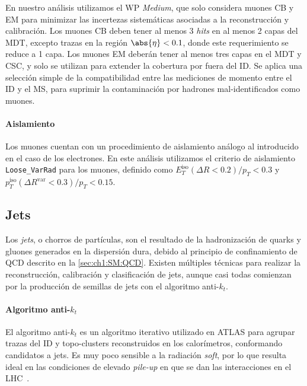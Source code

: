 En nuestro análisis utilizamos el WP \textit{Medium}, que solo considera muones CB y EM para minimizar las incertezas sistemáticas asociadas a la reconstrucción y calibración. Los muones CB deben tener al menos 3 \textit{hits} en al menos 2 capas del MDT, excepto trazas en la región $\abs{\eta} < 0.1$, donde este requerimiento se reduce a 1 capa. Los muones EM deberán tener al menos tres capas en el MDT y CSC, y solo se utilizan para extender la cobertura por fuera del ID. Se aplica una selección simple de la compatibilidad entre las mediciones de momento entre el ID y el MS, para suprimir la contaminación por hadrones mal-identificados como muones.

\paragraph{Aislamiento}

Los muones cuentan con un procedimiento de aislamiento análogo al introducido en el caso de los electrones. En este análisis utilizamos el criterio de aislamiento \texttt{Loose\_VarRad} para los muones, definido como $E_T^{\text{iso}}(\Delta R < 0.2)/p_T < 0.3$ y $p_T^{\text{iso}}(\Delta R^{\text{var}} < 0.3)/p_T < 0.15$.




\subsection{Jets} \label{sec:ch3:jets}

Los \textit{jets}, o chorros de partículas, son el resultado de la hadronización de quarks y gluones generados en la dispersión dura, debido al principio de confinamiento de QCD descrito en la \cref{sec:ch1:SM:QCD}. Existen múltiples técnicas para realizar la reconstrucción, calibración y clasificación de jets, aunque casi todas comienzan por la producción de semillas de jets con el algoritmo anti-$k_t$.

\paragraph{Algoritmo anti-$k_t$}

El algoritmo anti-$k_t$ es un algoritmo iterativo utilizado en ATLAS para agrupar trazas del ID y topo-clusters reconstruidos en los calorímetros, conformando candidatos a jets. Es muy poco sensible a la radiación \textit{soft}, por lo que resulta ideal en las condiciones de elevado \textit{pile-up} en que se dan las interacciones en el LHC~\cite{Cacciari2008}.

